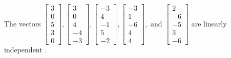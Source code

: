 \begin{exercise}
\begin{exerciseStatement}
  \end{exerciseStatement}
  \begin{exerciseAnswer}
   The vectors \(\left[\begin{array}{r}
3 \\
0 \\
5 \\
3 \\
0
\end{array}\right] , \left[\begin{array}{r}
3 \\
0 \\
4 \\
-4 \\
-3
\end{array}\right] , \left[\begin{array}{r}
-3 \\
4 \\
-1 \\
5 \\
-2
\end{array}\right] , \left[\begin{array}{r}
-3 \\
1 \\
-6 \\
4 \\
4
\end{array}\right] , \text{ and } \left[\begin{array}{r}
2 \\
-6 \\
-5 \\
3 \\
-6
\end{array}\right]\) are 
  	 linearly independent  .
  


  \end{exerciseAnswer}
\end{exercise}